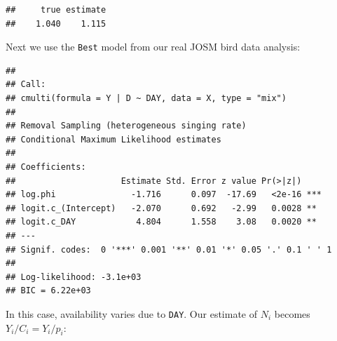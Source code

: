 \documentclass[12pt,]{book}
\newenvironment{Shaded}{\begin{snugshade}}{\end{snugshade}}
\newcommand{\DataTypeTok}[1]{\textcolor[rgb]{0.13,0.29,0.53}{#1}}
\newcommand{\DecValTok}[1]{\textcolor[rgb]{0.00,0.00,0.81}{#1}}
\newcommand{\KeywordTok}[1]{\textcolor[rgb]{0.13,0.29,0.53}{\textbf{#1}}}
\newcommand{\NormalTok}[1]{#1}
\newcommand{\OperatorTok}[1]{\textcolor[rgb]{0.81,0.36,0.00}{\textbf{#1}}}
\newcommand{\OtherTok}[1]{\textcolor[rgb]{0.56,0.35,0.01}{#1}}
\newcommand{\StringTok}[1]{\textcolor[rgb]{0.31,0.60,0.02}{#1}}
\begin{document}
\begin{verbatim}
##     true estimate 
##    1.040    1.115
\end{verbatim}

Next we use the \texttt{Best} model from our real JOSM bird data analysis:

\begin{Shaded}
\end{Shaded}

\begin{verbatim}
## 
## Call:
## cmulti(formula = Y | D ~ DAY, data = X, type = "mix")
## 
## Removal Sampling (heterogeneous singing rate)
## Conditional Maximum Likelihood estimates
## 
## Coefficients:
##                     Estimate Std. Error z value Pr(>|z|)    
## log.phi               -1.716      0.097  -17.69   <2e-16 ***
## logit.c_(Intercept)   -2.070      0.692   -2.99   0.0028 ** 
## logit.c_DAY            4.804      1.558    3.08   0.0020 ** 
## ---
## Signif. codes:  0 '***' 0.001 '**' 0.01 '*' 0.05 '.' 0.1 ' ' 1 
## 
## Log-likelihood: -3.1e+03 
## BIC = 6.22e+03
\end{verbatim}

In this case, availability varies due to \texttt{DAY}.
Our estimate of \(N_i\) becomes \(Y_i/C_i=Y_i/p_i\):

\begin{Shaded}
\end{Shaded}
\end{document}
